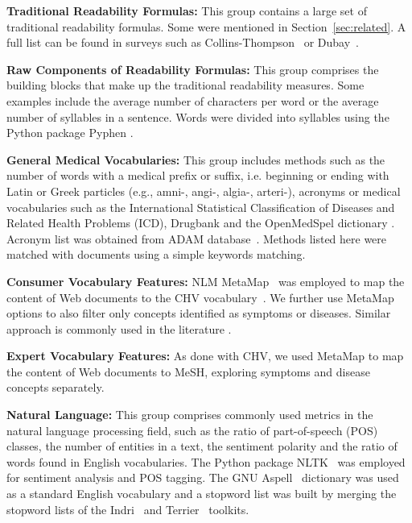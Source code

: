 
\textbf{Traditional Readability Formulas:}
This group contains a large set of traditional readability formulas. Some were mentioned in Section~\ref{sec:related}. A full list can be found in surveys such as Collins-Thompson~\cite{collins2014computational} or Dubay~\cite{dubay04}.

\textbf{Raw Components of Readability Formulas:}
This group comprises the building blocks that make up the traditional readability measures. Some examples include the average number of characters per word or the average number of syllables in a sentence. Words were divided into syllables using the Python package Pyphen \cite{pyphen}.

\textbf{General Medical Vocabularies:}
This group includes methods such as the number of words with a medical prefix or suffix, i.e. beginning or ending with Latin or Greek particles (e.g., amni-, angi-, algia-, arteri-), acronyms or medical vocabularies such as the International Statistical Classification of Diseases and Related Health Problems (ICD), Drugbank and the OpenMedSpel dictionary \cite{openmedspel}.
Acronym list was obtained from ADAM database~\cite{zhou2006}. Methods listed here were matched with documents using a simple keywords matching.

\textbf{Consumer Vocabulary Features:}
NLM MetaMap~\cite{aronson10} was employed to map the content of Web documents to the CHV vocabulary~\cite{zeng06}.
We further use MetaMap options to also filter only concepts identified as symptoms or diseases.
Similar approach is commonly used in the literature \cite{} .

\textbf{Expert Vocabulary Features:}
As done with CHV, we used MetaMap to map the content of Web documents to MeSH, exploring symptoms and disease concepts separately. 

\textbf{Natural Language:}
This group comprises commonly used metrics in the natural language processing field, such as the ratio of part-of-speech (POS) classes, the number of entities in a text, the sentiment polarity and the ratio of words found in English vocabularies. The Python package NLTK~\cite{nltk} was employed for sentiment analysis and POS tagging. The GNU Aspell~\cite{aspell} dictionary was used as a standard English vocabulary and a stopword list was built by merging the stopword
lists of the Indri~\cite{indri} and Terrier~\cite{terrier} toolkits. 

